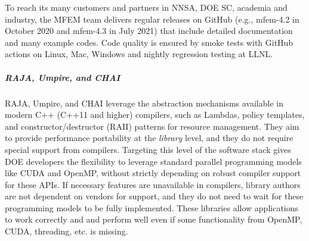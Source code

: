 To reach its many customers and partners in NNSA, DOE SC,
academia and industry, the MFEM team delivers regular releases on GitHub
(e.g., mfem-4.2 in October 2020 and mfem-4.3 in July 2021) that include
detailed documentation and many example codes.  Code quality is ensured
by smoke tests with GitHub actions on Linux, Mac, Windows and nightly
regression testing at LLNL.

\subparagraph{RAJA, Umpire, and CHAI}
RAJA, Umpire, and CHAI leverage the abstraction mechanisms available in
modern C++ (C++11 and higher) compilers, such as Lambdas, policy
templates, and constructor/destructor (RAII) patterns for resource
management.  They aim to provide performance portability at the {\it
library} level, and they do not require special support from compilers.
Targeting this level of the software stack gives DOE developers the
flexibility to leverage standard parallel programming models like CUDA
and OpenMP, without strictly depending on robust compiler support
for these APIs.  If necessary features are unavailable in compilers,
library authors are not dependent on vendors for support, and they do not
need to wait for these programming models to be fully implemented.  These
libraries allow applications to work correctly and and perform well even if
some functionality from OpenMP, CUDA, threading, etc. is missing.

